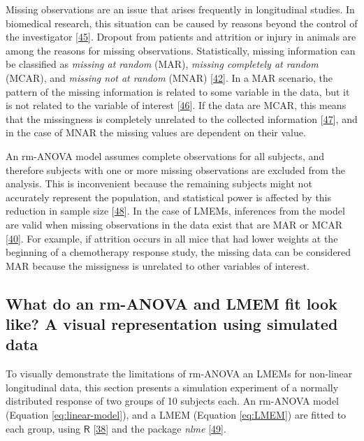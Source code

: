 \documentclass[
]{article}
\begin{document}
Missing observations are an issue that arises frequently in longitudinal studies. In biomedical research, this situation can be caused by reasons beyond the control of the investigator {[}\protect\hyperlink{ref-molenberghs2004}{45}{]}. Dropout from patients and attrition or injury in animals are among the reasons for missing observations. Statistically, missing information can be classified as \emph{missing at random} (MAR), \emph{missing completely at random} (MCAR), and \emph{missing not at random} (MNAR) {[}\protect\hyperlink{ref-weiss2005}{42}{]}. In a MAR scenario, the pattern of the missing information is related to some variable in the data, but it is not related to the variable of interest {[}\protect\hyperlink{ref-scheffer2002}{46}{]}. If the data are MCAR, this means that the missingness is completely unrelated to the collected information {[}\protect\hyperlink{ref-potthoff2006}{47}{]}, and in the case of MNAR the missing values are dependent on their value.

An rm-ANOVA model assumes complete observations for all subjects, and therefore subjects with one or more missing observations are excluded from the analysis. This is inconvenient because the remaining subjects might not accurately represent the population, and statistical power is affected by this reduction in sample size {[}\protect\hyperlink{ref-ma2012}{48}{]}. In the case of LMEMs, inferences from the model are valid when missing observations in the data exist that are MAR or MCAR {[}\protect\hyperlink{ref-west2014}{40}{]}. For example, if attrition occurs in all mice that had lower weights at the beginning of a chemotherapy response study, the missing data can be considered MAR because the missigness is unrelated to other variables of interest.

\hypertarget{simulation}{%
\subsection{What do an rm-ANOVA and LMEM fit look like? A visual representation using simulated data}\label{simulation}}

To visually demonstrate the limitations of rm-ANOVA an LMEMs for non-linear longitudinal data, this section presents a simulation experiment of a normally distributed response of two groups of 10 subjects each. An rm-ANOVA model (Equation \eqref{eq:linear-model}), and a LMEM (Equation \eqref{eq:LMEM}) are fitted to each group, using \(\textsf{R}\) {[}\protect\hyperlink{ref-r}{38}{]} and the package \emph{nlme} {[}\protect\hyperlink{ref-nlme}{49}{]}.
\end{document}
